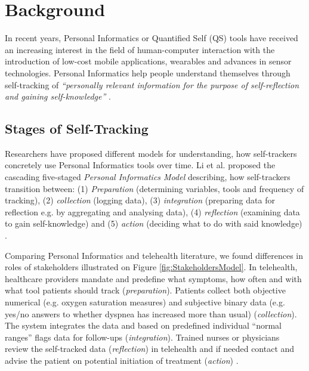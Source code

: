 \section{Background} 
In recent years, Personal Informatics or Quantified Self (QS) tools have received an increasing interest in the field of human-computer interaction with the introduction of low-cost mobile applications, wearables and advances in sensor technologies. Personal Informatics help people understand themselves through self-tracking of \textit{“personally relevant information for the purpose of self-reflection and gaining self-knowledge”} \cite{Li2010}. 

\subsection{Stages of Self-Tracking}
Researchers have proposed different models for understanding, how self-trackers concretely use Personal Informatics tools over time. Li et al. proposed the cascading five-staged \textit{Personal Informatics Model} describing, how self-trackers transition between: (1) \textit{Preparation} (determining variables, tools and frequency of tracking), (2) \textit{collection} (logging data), (3) \textit{integration} (preparing data for reflection e.g. by aggregating and analysing data), (4) \textit{reflection} (examining data to gain self-knowledge) and (5) \textit{action} (deciding what to do with said knowledge) \cite{Li2010}. 

Comparing Personal Informatics and telehealth literature, we found differences in roles of stakeholders illustrated on Figure \ref{fig:StakeholdersModel}. In telehealth, healthcare providers mandate and predefine what symptoms, how often and with what tool patients should track (\textit{preparation}). Patients collect both objective numerical (e.g. oxygen saturation measures) and subjective binary data (e.g. yes/no answers to whether dyspnea has increased more than usual) (\textit{collection}). The system integrates the data and based on predefined individual “normal ranges” flags data for follow-ups (\textit{integration}). Trained nurses or physicians review the self-tracked data (\textit{reflection}) in telehealth and if needed contact and advise the patient on potential initiation of treatment (\textit{action}) \cite{piloting, pedone}. 

